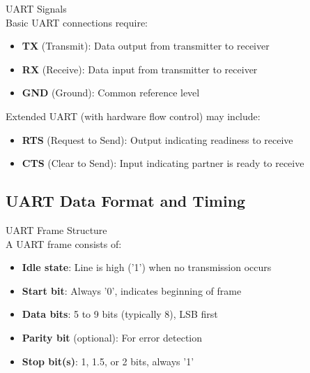 \begin{definition}{UART Signals}\\
Basic UART connections require:
\begin{itemize}
    \item \textbf{TX} (Transmit): Data output from transmitter to receiver
    \item \textbf{RX} (Receive): Data input from transmitter to receiver
    \item \textbf{GND} (Ground): Common reference level
\end{itemize}
Extended UART (with hardware flow control) may include:
\begin{itemize}
    \item \textbf{RTS} (Request to Send): Output indicating readiness to receive
    \item \textbf{CTS} (Clear to Send): Input indicating partner is ready to receive
\end{itemize}
\end{definition}

\multend

\subsection{UART Data Format and Timing}


\begin{definition}{UART Frame Structure}\\
A UART frame consists of:
\begin{itemize}
    \item \textbf{Idle state}: Line is high ('1') when no transmission occurs
    \item \textbf{Start bit}: Always '0', indicates beginning of frame
    \item \textbf{Data bits}: 5 to 9 bits (typically 8), LSB first
    \item \textbf{Parity bit} (optional): For error detection
    \item \textbf{Stop bit(s)}: 1, 1.5, or 2 bits, always '1'
\end{itemize}
\end{definition}

